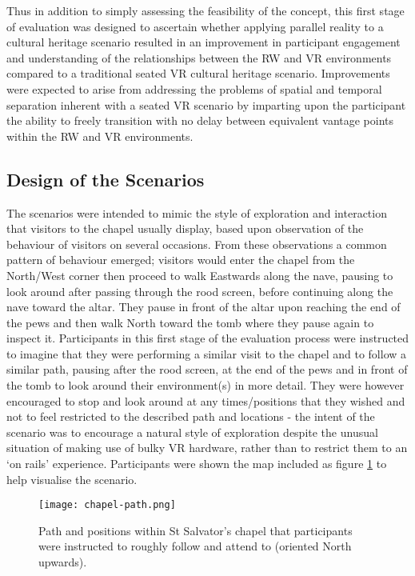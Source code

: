 Thus in addition to simply assessing the feasibility of the concept, this first stage of evaluation was designed to ascertain whether applying parallel reality to a cultural heritage scenario resulted in an improvement in participant engagement and understanding of the relationships between the RW and VR environments compared to a traditional seated VR cultural heritage scenario. Improvements were expected to arise from addressing the problems of spatial and temporal separation inherent with a seated VR scenario by imparting upon the participant the ability to freely transition with no delay between equivalent vantage points within the RW and VR environments.


\subsection{Design of the Scenarios}

The scenarios were intended to mimic the style of exploration and interaction that visitors to the chapel usually display, based upon observation of the behaviour of visitors on several occasions. From these observations a common pattern of behaviour emerged; visitors would enter the chapel from the North/West corner then proceed to walk Eastwards along the nave, pausing to look around after passing through the rood screen, before continuing along the nave toward the altar. They pause in front of the altar upon reaching the end of the pews and then walk North toward the tomb where they pause again to inspect it. Participants in this first stage of the evaluation process were instructed to imagine that they were performing a similar visit to the chapel and to follow a similar path, pausing after the rood screen, at the end of the pews and in front of the tomb to look around their environment(s) in more detail. They were however encouraged to stop and look around at any times/positions that they wished and not to feel restricted to the described path and locations - the intent of the scenario was to encourage a natural style of exploration despite the unusual situation of making use of bulky VR hardware, rather than to restrict them to an `on rails' experience. Participants were shown the map included as figure \ref{chapel-path} to help visualise the scenario.

\begin{figure}
	\begin{center}
		\texttt{[image: chapel-path.png]}
		\caption{Path and positions within St Salvator's chapel that participants were instructed to roughly follow and attend to (oriented North upwards).}
		\label{chapel-path}
	\end{center}
\end{figure}

